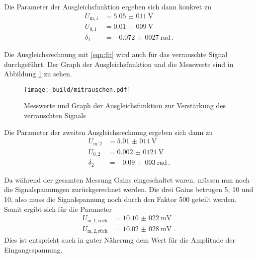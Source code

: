 Die Parameter der Ausgleichsfunktion ergeben sich dann konkret zu
\begin{align*}
  U_\mathrm{m,1} &= \SI{5,05(011)}{\volt} \,\\
  U_{0,1} &= \SI{0,01(009)}{\volt} \,\\
  \delta_1 &= \SI{-0,072(0027)}{\radian} \,.
\end{align*}

Die Ausgleichsrechnung mit \eqref{eqn:fit} wird auch für das verrauschte Signal durchgeführt.
Der Graph der Ausgleichsfunktion und die Messwerte sind in Abbildung \ref{fig:rausch}
zu sehen.

\begin{figure}
  \centering
  \texttt{[image: build/mitrauschen.pdf]}
  \caption{Messwerte und Graph der Ausgleichsfunktion zur Verstärkung des verrauschten Signals}
  \label{fig:rausch}
\end{figure}

Die Parameter der zweiten Ausgleichsrechnung ergeben sich dann zu
\begin{align*}
  U_\mathrm{m,2} &= \SI{5,01(014)}{\volt} \,\\
  U_{0,2} &= \SI{0,002(0124)}{\volt} \,\\
  \delta_2 &= \SI{-0,09(003)}{\radian} \,.
\end{align*}

Da während der gesamten Messung Gains eingeschaltet waren, müssen nun noch die
Signalspannungen zurückgerechnet werden. Die drei Gains betrugen 5, 10 und 10, also
muss die Signalspannung noch durch den Faktor 500 geteilt werden. Somit ergibt
sich für die Parameter
\begin{align}
  U_\mathrm{m,1,rück} &= \SI{10,10(022)}{\milli\volt} \,\\
  U_\mathrm{m,2,rück} &= \SI{10,02(028)}{\milli\volt} \, \,.
\end{align}
Dies ist entspricht auch in guter Näherung dem Wert für die  Amplitude der
Eingangsspannung.
